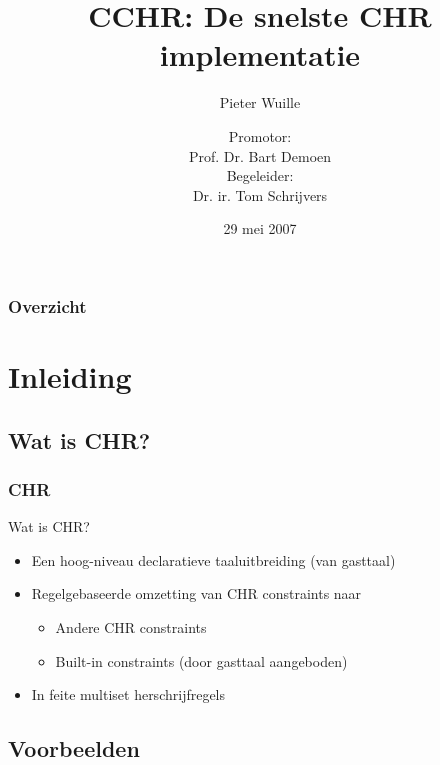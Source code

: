 \documentclass{beamer}
\title{CCHR: De snelste CHR implementatie}
\subtitle{Pieter Wuille}
\author{Promotor: \\
Prof. Dr. Bart Demoen \\
Begeleider: \\
Dr. ir. Tom Schrijvers}
\date{29 mei 2007}
\begin{document}
\frame{\titlepage}


\begin{frame}
  \frametitle{Overzicht}
  \tableofcontents[hideothersubsections]
\end{frame}


\section{Inleiding}

\subsection{Wat is CHR?}

\begin{frame}[containsverbatim]
  \frametitle{CHR}
  \begin{block}{Wat is CHR?}
    \begin{itemize}
      \item Een hoog-niveau declaratieve taaluitbreiding (van gasttaal)
      \item Regelgebaseerde omzetting van CHR constraints naar \begin{itemize}
        \item Andere CHR constraints
        \item Built-in constraints (door gasttaal aangeboden)
      \end{itemize}
      \item In feite multiset herschrijfregels
    \end{itemize}
  \end{block}

\end{frame}

\subsection{Voorbeelden}
\end{document}
